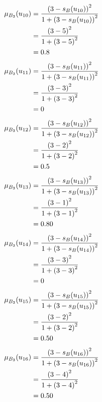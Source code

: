\documentclass[a4paper,openany]{book}
\begin{document}
				\begin{align}
					\mu_{B_3}(u_{10}) &= \frac{\left(3-s_B(u_{10})\right)^2}{1 + \left(3-s_B(u_{10})\right)^2}\\
					&= \frac{\left(3-5\right)^2}{1 + \left(3-5\right)^2} \notag \\
					&= 0.8 \notag
				\end{align}
				\begin{align}
					\mu_{B_3}(u_{11}) &= \frac{\left(3-s_B(u_{11})\right)^2}{1 + \left(3-s_B(u_{11})\right)^2}\\
					&= \frac{\left(3-3\right)^2}{1 + \left(3-3\right)^2} \notag \\
					&= 0 \notag
				\end{align}
				\begin{align}
					\mu_{B_3}(u_{12}) &= \frac{\left(3-s_B(u_{12})\right)^2}{1 + \left(3-s_B(u_{12})\right)^2}\\
					&= \frac{\left(3-2\right)^2}{1 + \left(3-2\right)^2} \notag \\
					&= 0.5 \notag
				\end{align}
				\begin{align}
					\mu_{B_3}(u_{13}) &= \frac{\left(3-s_B(u_{13})\right)^2}{1 + \left(3-s_B(u_{13})\right)^2}\\
					&= \frac{\left(3-1\right)^2}{1 + \left(3-1\right)^2} \notag \\
					&= 0.80 \notag
				\end{align}
				\begin{align}
					\mu_{B_3}(u_{14}) &= \frac{\left(3-s_B(u_{14})\right)^2}{1 + \left(3-s_B(u_{14})\right)^2}\\
					&= \frac{\left(3-3\right)^2}{1 + \left(3-3\right)^2} \notag \\
					&= 0 \notag
				\end{align}
				\begin{align}
					\mu_{B_3}(u_{15}) &= \frac{\left(3-s_B(u_{15})\right)^2}{1 + \left(3-s_B(u_{15})\right)^2}\\
					&= \frac{\left(3-2\right)^2}{1 + \left(3-2\right)^2} \notag \\
					&= 0.50 \notag
				\end{align}
				\begin{align}
					\mu_{B_3}(u_{16}) &= \frac{\left(3-s_B(u_{16})\right)^2}{1 + \left(3-s_B(u_{16})\right)^2}\\
					&= \frac{\left(3-4\right)^2}{1 + \left(3-4\right)^2} \notag \\
					&= 0.50 \notag
				\end{align}
\end{document}
